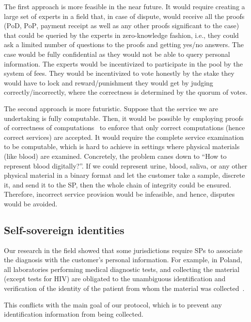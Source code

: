 The first approach is more feasible in the near future. It would require creating a large set of experts in a field that, in case of dispute, would receive all the proofs ($\mathrm{PoD}$, $\mathrm{PoP}$, payment $\mathrm{receipt}$ as well as any other proofs significant to the case) that could be queried by the experts in zero-knowledge fashion, i.e., they could ask a limited number of questions to the proofs and getting yes/no answers. The case would be fully confidential as they would not be able to query personal information. The experts would be incentivized to participate in the pool by the system of fees. They would be incentivized to vote honestly by the stake they would have to lock and reward/punishment they would get by judging correctly/incorrectly, where the correctness is determined by the quorum of votes.

The second approach is more futuristic. Suppose that the service we are undertaking is fully computable. Then, it would be possible by employing proofs of correctness of computations~\cite{ben-sassonSNARKsVerifyingProgram2013} to enforce that only correct computations (hence correct services) are accepted. It would require the complete service examination to be computable, which is hard to achieve in settings where physical materials (like blood) are examined. Concretely, the problem canes down to ``How to represent blood digitally?''. If we could represent urine, blood, saliva, or any other physical material in a binary format and let the customer take a sample, discrete it, and send it to the SP, then the whole chain of integrity could be ensured. Therefore, incorrect service provision would be infeasible, and hence, disputes would be avoided.

\subsection{Self-sovereign identities}
Our research in the field showed that some jurisdictions require SPs to associate the diagnosis with the customer's personal information. For example, in Poland, all laboratories performing medical diagnostic tests, and collecting the material (except tests for HIV) are obligated to the unambiguous identification and verification of the identity of the patient from whom the material was collected~\cite{ministerstwozdrowiaRegulationMinisterHealth2006}.

This conflicts with the main goal of our protocol, which is to prevent any identification information from being collected.

